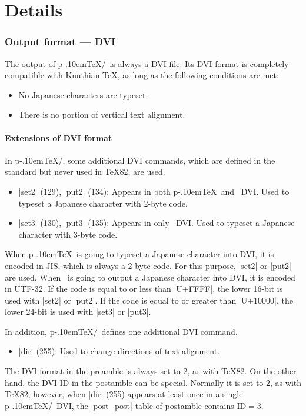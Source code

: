 \documentclass[a4paper,11pt]{article}
\def\pTeX{p\kern-.10em\TeX}
\begin{document}
\newpage


\part{Details}%

\section{Output format --- DVI}

The output of \pTeX/\upTeX\ is always a DVI file.
Its DVI format is completely compatible with Knuthian \TeX,
as long as the following conditions are met:
\begin{itemize}
  \item No Japanese characters are typeset.
  \item There is no portion of vertical text alignment.
\end{itemize}

\subsection{Extensions of DVI format}

In \pTeX/\upTeX,
some additional DVI commands, which are defined in the
standard \cite{dvistd0} but never used in \TeX82, are used.
\begin{itemize}
  \item |set2| (129), |put2| (134):
    Appears in both \pTeX\ and \upTeX\ DVI.
    Used to typeset a Japanese character with 2-byte code. 
  \item |set3| (130), |put3| (135):
    Appears in only \upTeX\ DVI.
    Used to typeset a Japanese character with 3-byte code.
\end{itemize}
When \pTeX\ is going to typeset a Japanese character into DVI,
it is encoded in JIS, which is always a 2-byte code.
For this purpose, |set2| or |put2| are used.
When \upTeX\ is going to output a Japanese character into DVI,
it is encoded in UTF-32.
If the code is equal to or less than |U+FFFF|,
the lower 16-bit is used with |set2| or |put2|.
If the code is equal to or greater than |U+10000|,
the lower 24-bit is used with |set3| or |put3|.

In addition, \pTeX/\upTeX\ defines one additional DVI command.
\begin{itemize}
  \item |dir| (255):
    Used to change directions of text alignment.
\end{itemize}
The DVI format in the preamble is always set to 2, as with \TeX82.
On the other hand, the DVI ID in the postamble can be special.
Normally it is set to 2, as with \TeX82; however,
when |dir| (255) appears at least once in a single \pTeX/\upTeX\ DVI,
the |post_post| table of postamble contains $\mathrm{ID} = 3$.
\end{document}
